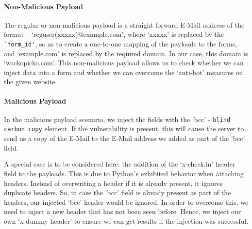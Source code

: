 \paragraph{Non-Malicious Payload}
\label{Comp:Fuzzer:nmp}
The regular or non-malicious payload is a straight forward E-Mail address of the format -- `reguser(xxxxx)@example.com', where `xxxxx' is replaced by the \lstinline{`form_id'}, so as to create a one-to-one mapping of the payloads to the forms, and `example.com' is replaced by the required domain. In our case, this domain is `wackopicko.com'.
This non-malicious payload allows us to check whether we can inject data into a form and whether we can overcome the `anti-bot' measures on the given website.

\paragraph{Malicious Payload}
\label{Comp:Fuzzer:mp}
In the malicious payload scenario, we inject the fields with the `bcc' - \lstinline{blind carbon copy} element. If the vulnerability is present, this will cause the server to send us a copy of the E-Mail to the E-Mail address we added as part of the `bcc' field.

A special case is to be considered here: the addition of the `x-check:in' header field to the payloads. This is due to Python's exhibited behavior when attaching
headers. Instead of overwriting a header if it is already present, it ignores duplicate headers. So, in case the `bcc' field is already present as part of the headers, our injected `bcc' header would be ignored. In order to overcome this, we need to inject a new header that has not been seen before. Hence, we inject our own `x-dummy-header' to ensure we can get results if the injection was successful.

